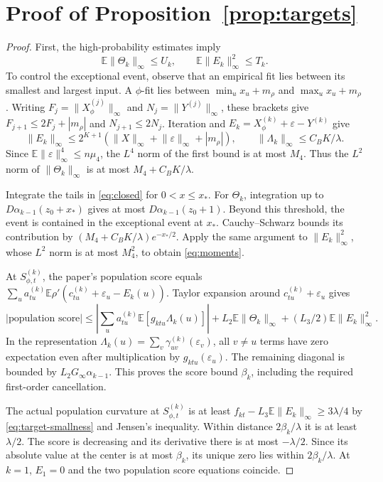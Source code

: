 \documentclass[11pt]{article}
\newcommand{\E}{\mathbb E}
\newcommand{\norm}[1]{\lVert#1\rVert}
\theoremstyle{remark}
\begin{document}
\section{Proof of Proposition~\ref{prop:targets}}\label{sec:targetproof}
\begin{proof}
First, the high-probability estimates imply
\begin{equation}
 \E\norm{\Theta_k}_\infty\le U_k,\qquad
 \E\norm{E_k}_\infty^2\le T_k.
 \label{eq:moments}
\end{equation}
To control the exceptional event, observe that an empirical fit lies between its
smallest and largest input. A \(\phi\)-fit lies between
\(\min_u x_u+m_\rho\) and \(\max_u x_u+m_\rho\).
Writing \(F_j=\|X_\phi^{(j)}\|_\infty\) and \(N_j=\|Y^{(j)}\|_\infty\),
these brackets give \(F_{j+1}\le2F_j+|m_\rho|\) and \(N_{j+1}\le2N_j\).
Iteration and \(E_k=X_\phi^{(k)}+\varepsilon-Y^{(k)}\) give
\[
 \norm{E_k}_\infty
 \le2^{K+1}(\norm X_\infty+\norm\varepsilon_\infty+|m_\rho|),
 \qquad \norm{\Lambda_k}_\infty\le C_BK/\lambda.
\]
Since \(\E\norm\varepsilon_\infty^4\le n\mu_4\), the \(L^4\) norm of
the first bound is at most \(M_4\). Thus the \(L^2\) norm of
\(\norm{\Theta_k}_\infty\) is at most \(M_4+C_BK/\lambda\).

Integrate the tails in \eqref{eq:closed} for \(0<x\le x_*\).
For \(\Theta_k\), integration up to \(D\alpha_{k-1}(z_0+x_*)\)
gives at most \(D\alpha_{k-1}(z_0+1)\). Beyond this threshold, the
event is contained in the exceptional event at \(x_*\).
Cauchy--Schwarz bounds its contribution by
\((M_4+C_BK/\lambda)e^{-x_*/2}\).
Apply the same argument to \(\norm{E_k}_\infty^2\), whose \(L^2\) norm
is at most \(M_4^2\), to obtain \eqref{eq:moments}.

At \(S_{\phi,t}^{(k)}\), the paper's population score equals
\(\sum_u a_{tu}^{(k)}\E\rho'(c_{tu}^{(k)}+\varepsilon_u-E_k(u))\).
Taylor expansion around \(c_{tu}^{(k)}+\varepsilon_u\) gives
\[
 \left|\text{population score}\right|
 \le\left|\sum_u a_{tu}^{(k)}\E[g_{ktu}\Lambda_k(u)]\right|
       +L_2\E\norm{\Theta_k}_\infty
       +(L_3/2)\E\norm{E_k}_\infty^2 .
\]
In the representation \(\Lambda_k(u)=\sum_v\gamma_{uv}^{(k)}(\varepsilon_v)\),
all \(v\ne u\) terms have zero expectation even after multiplication by
\(g_{ktu}(\varepsilon_u)\). The remaining diagonal is bounded by
\(L_2G_\infty\alpha_{k-1}\).
This proves the score bound \(\beta_k\), including the required
first-order cancellation.

The actual population curvature at \(S_{\phi,t}^{(k)}\) is at least
\(f_{kt}-L_3\E\norm{E_k}_\infty\ge3\lambda/4\) by
\eqref{eq:target-smallness} and Jensen's inequality.
Within distance \(2\beta_k/\lambda\) it is at least \(\lambda/2\).
The score is decreasing and its derivative there is at most
\(-\lambda/2\). Since its absolute value at the center is at most
\(\beta_k\), its unique zero lies within \(2\beta_k/\lambda\).
At \(k=1\), \(E_1=0\) and the two population score equations coincide.
\end{proof}
\end{document}
